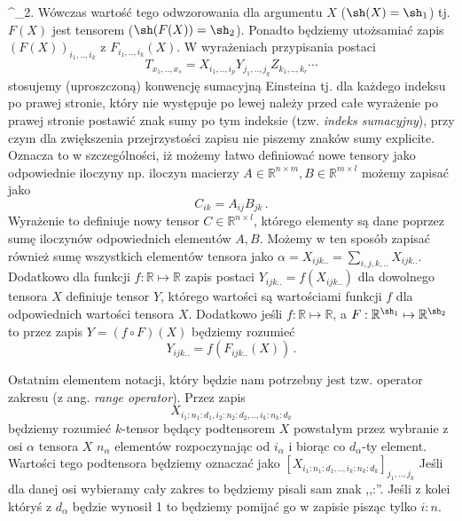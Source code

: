 \documentclass{myclass}
\begin{document}
^{\sh_2}\). Wówczas wartość tego odwzorowania dla argumentu \(X\) (\(\sh(X) = \sh_1\)) tj.
\(F(X)\) jest tensorem (\(\sh(F(X)) = \sh_2\)). Ponadto będziemy utożsamiać zapis
\((F(X))_{i_1,..,i_k}\) z \(F_{i_1,..,i_k}(X)\).\hfill
\break
W wyrażeniach przypisania postaci 
\begin{equation*}
    T_{x_1,..,x_s} = X_{i_1,..,i_p}Y_{j_1,..,j_q}Z_{k_1,..,k_r}\cdots
\end{equation*}
stosujemy (uproszczoną) konwencję sumacyjną Einsteina tj. dla każdego indeksu po prawej stronie,
który nie występuje po lewej należy przed całe wyrażenie po prawej stronie postawić znak sumy po tym
indeksie (tzw. \textit{indeks sumacyjny}), przy czym dla zwiększenia przejrzystości zapisu nie
piszemy znaków sumy explicite. Oznacza to w szczególności, iż możemy łatwo definiować nowe tensory
jako odpowiednie iloczyny np. iloczyn macierzy \(A \in \mathbb{R}^{n\times m}, B \in
\mathbb{R}^{m\times l}\) możemy zapisać jako
\begin{equation*}
    C_{ik} = A_{ij}B_{jk}\,.
\end{equation*}
Wyrażenie to definiuje nowy tensor \(C \in \mathbb{R}^{n \times l}\), którego elementy są dane
poprzez sumę iloczynów odpowiednich elementów \(A, B\). Możemy w ten sposób zapisać również sumę
wszystkich elementów tensora jako \(\alpha = X_{ijk..} = \sum_{i,j,k,..} X_{ijk..}\). Dodatkowo dla
funkcji \(f: \mathbb{R} \mapsto \mathbb{R}\) zapis postaci \(Y_{ijk..} = f(X_{ijk..})\) dla
dowolnego tensora \(X\) definiuje tensor \(Y\), którego wartości są wartościami funkcji \(f\) dla
odpowiednich wartości tensora \(X\). Dodatkowo jeśli \(f: \mathbb{R} \mapsto \mathbb{R}\), a \(F :
\mathbb{R}^{\sh_1} \mapsto \mathbb{R}^{\sh_2}\) to przez zapis \(Y = (f \circ F)(X)\) będziemy
rozumieć 
\begin{equation*}
    Y_{ijk..} = f(F_{ijk..}(X))\,.
\end{equation*}

Ostatnim elementem notacji, który będzie nam potrzebny jest tzw. operator zakresu (z ang.
\textit{range operator}). Przez zapis 
\begin{equation*} 
    X_{i_1:n_1:d_1, i_2:n_2:d_2,..,i_k:n_k:d_k}
\end{equation*} 
będziemy rozumieć \(k\)-tensor będący podtensorem \(X\) powstałym przez wybranie z osi \(\alpha\)
tensora \(X\) \(n_\alpha\) elementów rozpoczynając od \(i_\alpha\) i biorąc co \(d_\alpha\)-ty
element. Wartości tego podtensora będziemy oznaczać jako
\([X_{i_1:n_1:d_1,..,i_k:n_k:d_k}]_{j_1,..,j_k}\) Jeśli dla danej osi wybieramy cały zakres to
będziemy pisali sam znak ,,:''. Jeśli z kolei któryś z \(d_\alpha\) będzie wynosił 1 to będziemy
pomijać go w zapisie pisząc tylko \(i:n\).
\end{document}
